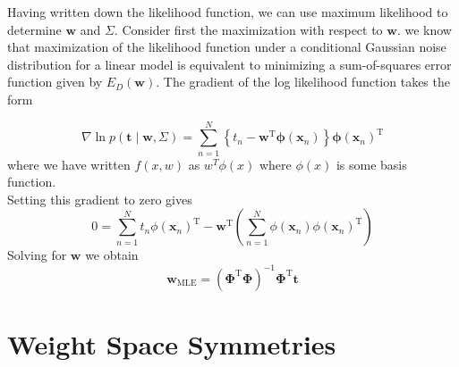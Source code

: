 \documentclass[english,a4paper,12pt]{article}
\begin{document}
{Having written down the likelihood function, we can use maximum likelihood to determine $\mathbf{w}$ and $\Sigma$. Consider first the maximization with respect to $\mathbf{w}$. we know that maximization of the likelihood function under a conditional Gaussian noise distribution for a linear model is equivalent to minimizing a sum-of-squares error function given by $E_{D}(\mathbf{w}) .$ The gradient of the log likelihood function  takes the form

$$
\boxed{
\nabla \ln p(\mathbf{t} \mid \mathbf{w}, \Sigma)=\sum_{n=1}^{N}\left\{t_{n}-\mathbf{w}^{\mathrm{T}} \boldsymbol{\phi}\left(\mathbf{x}_{n}\right)\right\} \boldsymbol{\phi}\left(\mathbf{x}_{n}\right)^{\mathrm{T}}
}
$$
where we have written $f(x,w)$ as $w^T\phi(x)$ where $\phi(x)$ is some basis function. \\
Setting this gradient to zero gives
$$
0=\sum_{n=1}^{N} t_{n} \phi\left(\mathbf{x}_{n}\right)^{\mathrm{T}}-\mathbf{w}^{\mathrm{T}}\left(\sum_{n=1}^{N} \phi\left(\mathbf{x}_{n}\right) \phi\left(\mathbf{x}_{n}\right)^{\mathrm{T}}\right)
$$
Solving for $\mathbf{w}$ we obtain
$$
\boxed{
\mathbf{w}_{\mathrm{MLE}}=\left(\boldsymbol{\Phi}^{\mathrm{T}} \boldsymbol{\Phi}\right)^{-1} \boldsymbol{\Phi}^{\mathrm{T}} \mathbf{t}
}
$$
}

\section{Weight Space Symmetries}
\end{document}
